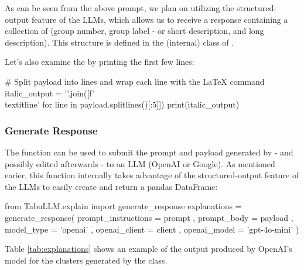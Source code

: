 \documentclass[article]{jss}
\begin{document}
As can be seen from the above prompt, we plan on utilizing the structured-output feature of the LLMs, which allows us to receive a response containing a collection of (group number, group label - or short description, and long description). This structure is defined in the  (internal) class of . %

Let's also examine the  by printing the first few lines:
\begin{pyblock}
# Split payload into lines and wrap each line with the LaTeX \textit{} command
italic_output = '\n'.join([f'\\textit{{{line}}}' for line in payload.splitlines()[:5]])
print(italic_output)
\end{pyblock}
\stdoutpythontex
  
\subsubsection{Generate Response}\label{subsubsec:using-explain-response}

The  function can be used to submit the prompt and payload generated by  - and possibly edited afterwards - to an LLM (OpenAI or Google). As mentioned earier, this function internally takes advantage of the structured-output feature of the LLMs to easily create and return a pandas DataFrame:
\begin{pyverbatim}
from TabuLLM.explain import generate_response
explanations = generate_response(
    prompt_instructions = prompt
    , prompt_body = payload
    , model_type = 'openai'
    , openai_client = client
    , openai_model = 'gpt-4o-mini'
)
\end{pyverbatim}

Table \ref{tab:explanations} shows an example of the output produced by OpenAI's  model for the clusters generated by the  class.
\end{document}
